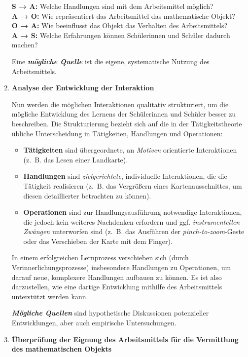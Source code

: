 \documentclass[
  ngerman,
]{scrbook}
\providecommand{\tightlist}{%
  \setlength{\itemsep}{0pt}\setlength{\parskip}{0pt}}
\theoremstyle{definition}
\theoremstyle{definition}
\theoremstyle{definition}
\theoremstyle{definition}
\theoremstyle{remark}
\begin{document}
\begin{enumerate}
  \textbf{S → A:} Welche Handlungen sind mit dem Arbeitsmittel möglich?\\
  \textbf{A → O:} Wie repräsentiert das Arbeitsmittel das mathematische Objekt?\\
  \textbf{O → A:} Wie beeinflusst das Objekt das Verhalten des Arbeitsmittels?\\
  \textbf{A → S:} Welche Erfahrungen können Schülerinnen und Schüler dadurch machen?

  Eine \textbf{\emph{mögliche Quelle}} ist die eigene, systematische Nutzung des Arbeitsmittels.
\item
  \textbf{Analyse der Entwicklung der Interaktion}

  Nun werden die möglichen Interaktionen qualitativ strukturiert, um die mögliche Entwicklung des Lernens der Schülerinnen und Schüler besser zu beschreiben. Die Strukturierung bezieht sich auf die in der Tätigkeitstheorie übliche Unterscheidung in Tätigkeiten, Handlungen und Operationen:

  \begin{itemize}
  \tightlist
  \item
    \textbf{Tätigkeiten} sind übergeordnete, an \emph{Motiven} orientierte Interaktionen (z.~B. das Lesen einer Landkarte).
  \item
    \textbf{Handlungen} sind \emph{zielgerichtete}, individuelle Interaktionen, die die Tätigkeit realisieren (z.~B. das Vergrößern eines Kartenausschnittes, um diesen detaillierter betrachten zu können).
  \item
    \textbf{Operationen} sind zur Handlungsausführung notwendige Interaktionen, die jedoch kein weiteres Nachdenken erfordern und ggf. \emph{instrumentellen Zwängen} unterworfen sind (z.~B. das Ausführen der \emph{pinch-to-zoom}-Geste oder das Verschieben der Karte mit dem Finger).
  \end{itemize}

  In einem erfolgreichen Lernprozess verschieben sich (durch Verinnerlichungsprozesse) insbesondere Handlungen zu Operationen, um darauf neue, komplexere Handlungen aufbauen zu können. Es ist also darzustellen, wie eine dartige Entwicklung mithilfe des Arbeitsmittels unterstützt werden kann.

  \textbf{\emph{Mögliche Quellen}} sind hypothetische Diskussionen potenzieller Entwicklungen, aber auch empirische Untersuchungen.
\item
  \textbf{Überprüfung der Eignung des Arbeitsmittels für die Vermittlung des mathematischen Objekts}


\end{enumerate}
\end{document}
